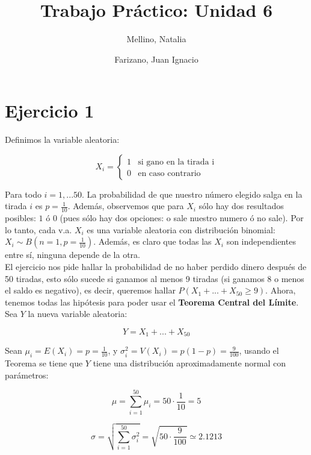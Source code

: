 \documentclass[11pt]{article}
\title{Trabajo Práctico: Unidad 6}
\author{Mellino, Natalia \and Farizano, Juan Ignacio}
\date{}
\begin{document}
\maketitle


\section*{Ejercicio 1}

Definimos la variable aleatoria: 

\[
  X_i = \begin{cases}
            1 & \text{si gano en la tirada i} \\
            0 & \text{en caso contrario}
        \end{cases}  
\]

Para todo $i = 1,...50$. La probabilidad de que nuestro número elegido
salga en la tirada $i$ es $p = \frac{1}{10}$. Además, observemos que
para $X_i$ sólo hay dos resultados posibles: $1$ ó $0$ (pues sólo hay
dos opciones: o sale nuestro numero ó no sale). Por lo tanto, cada v.a.
$X_i$ es una variable aleatoria con distribución binomial: $X_i \sim B(n = 1, p = \frac{1}{10})$.
Además, es claro que todas las $X_i$ son independientes entre sí, ninguna depende
de la otra. \\

El ejercicio nos pide hallar la probabilidad de no haber perdido dinero
después de 50 tiradas, esto sólo sucede si ganamos al menos 9 tiradas (si ganamos 8 o menos el saldo es negativo), 
es decir, queremos hallar $P(X_1 + ... + X_{50} \geq 9)$. Ahora, 
tenemos todas las hipótesis para poder usar el \textbf{Teorema Central del Límite}. Sea $Y$
la nueva variable aleatoria:

\begin{equation*}    
    Y = X_1 + ... + X_{50}
\end{equation*}

Sean $\mu_i = E(X_i) = p = \frac{1}{10}$,  y $\sigma_i^2 = V(X_i) = p(1 - p ) = \frac{9}{100}$, usando
el Teorema se tiene que $Y$ tiene una distribución aproximadamente normal con parámetros:

\begin{equation*}
    \mu = \displaystyle\sum_{i=1}^{50} \mu_i = 50 \cdot \frac{1}{10} = 5
\end{equation*}

\begin{equation*}
    \sigma = \sqrt{\displaystyle\sum_{i=1}^{50} \sigma_i^2} = \sqrt{50 \cdot \frac{9}{100}} \simeq 2.1213
\end{equation*}
\end{document}
